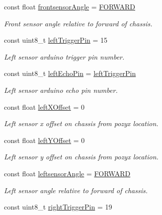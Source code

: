 \begin{DoxyCompactItemize}
const float \mbox{\hyperlink{bot_main_8ino_ad681cfe410d5d764c513368773b9de93}{frontsensor\+Angle}} = \mbox{\hyperlink{bot_main_8ino_a6ddfdda7a062d10cff4a72b76b44aeb8}{F\+O\+R\+W\+A\+RD}}
\begin{DoxyCompactList}\small\item\em Front sensor angle relative to forward of chassis. \end{DoxyCompactList}\item 
const uint8\+\_\+t \mbox{\hyperlink{bot_main_8ino_a297d5238270dc0d92e1a65b016a79f2e}{left\+Trigger\+Pin}} = 15
\begin{DoxyCompactList}\small\item\em Left sensor arduino trigger pin number. \end{DoxyCompactList}\item 
const uint8\+\_\+t \mbox{\hyperlink{bot_main_8ino_a203479aa2174a6eedd63da361e6e302c}{left\+Echo\+Pin}} = \mbox{\hyperlink{bot_main_8ino_a297d5238270dc0d92e1a65b016a79f2e}{left\+Trigger\+Pin}}
\begin{DoxyCompactList}\small\item\em Left sensor arduino echo pin number. \end{DoxyCompactList}\item 
const float \mbox{\hyperlink{bot_main_8ino_a2d121af61e2977de12f5bfbbe8559dca}{left\+X\+Offset}} = 0
\begin{DoxyCompactList}\small\item\em Left sensor x offset on chassis from pozyx location. \end{DoxyCompactList}\item 
const float \mbox{\hyperlink{bot_main_8ino_a7be9826e4f54e376321bcdea4177a8ed}{left\+Y\+Offset}} = 0
\begin{DoxyCompactList}\small\item\em Left sensor y offset on chassis from pozyx location. \end{DoxyCompactList}\item 
const float \mbox{\hyperlink{bot_main_8ino_a8be5324bad65fa0bad41e0c70066a958}{leftsensor\+Angle}} = \mbox{\hyperlink{bot_main_8ino_a6ddfdda7a062d10cff4a72b76b44aeb8}{F\+O\+R\+W\+A\+RD}}
\begin{DoxyCompactList}\small\item\em Left sensor angle relative to forward of chassis. \end{DoxyCompactList}\item 
const uint8\+\_\+t \mbox{\hyperlink{bot_main_8ino_a906054d9d48970211789ac841d331898}{right\+Trigger\+Pin}} = 19

\end{DoxyCompactItemize}
